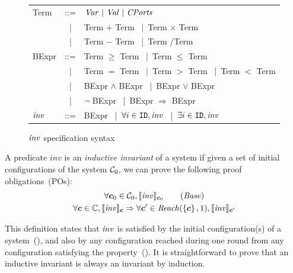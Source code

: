 \begin{figure}[!htbp]
\newcommand{\vbar}{{\normalfont\ |\ }}
\itshape
\begin{tabular}{l@{\ }r@{\ \ }l}
    Term   &   ::= & $\Var \vbar \Val \vbar \Cfield$                                           \\
           & \vbar & Term $+$ Term \vbar Term $\times$ Term                                    \\
           & \vbar & Term $-$ Term \vbar Term \slash Term                                      \\
    BExpr  &   ::= & Term $\geq$ Term \vbar Term $\leq$ Term                                   \\
           & \vbar & Term $=$ Term \vbar Term $>$ Term \vbar Term $<$ Term                     \\
           & \vbar & BExpr $\wedge$ BExpr \vbar BExpr $\vee$ BExpr                             \\
           & \vbar & $\neg$ BExpr \vbar BExpr $\Rightarrow$ BExpr                              \\
    $\mathit{inv}$ &   ::= & BExpr \vbar $\forall i \in \texttt{ID}, \mathit{inv}$ \vbar $\exists i \in \texttt{ID}, \mathit{inv}$
\end{tabular}

\caption{$\mathit{inv}$ specification syntax}\label{fig:inv-syntax}
\end{figure}


\begin{definition}
\label{def:ii}
A predicate $\mathit{inv}$ is an \emph{inductive invariant} of a system if given a set of initial configurations of the system $\mathcal{C}_0$,
we can prove the following proof obligations~(POs):
\begin{gather}
\forall \gconfig_0\in \gset_0, \eec{\Inv}{\gconfig_0} \label{po:base}\tag{\textit{Base}}\\
\forall \gconfig \in \pwg, \eec{\Inv}{\gconfig} \Rightarrow \forall \gconfig' \in \Reach(\left\{\gconfig\right\},1), \eec{\Inv}{\gconfig'} \label{po:ind-hyp-orig}
\end{gather}
\end{definition}
This definition states that $\mathit{inv}$ is satisfied by the initial configuration(s) of a system~(),
and also by any configuration reached during one round from any configuration satisfying the property~().
It is straightforward to prove that an inductive invariant is always an invariant by induction.

